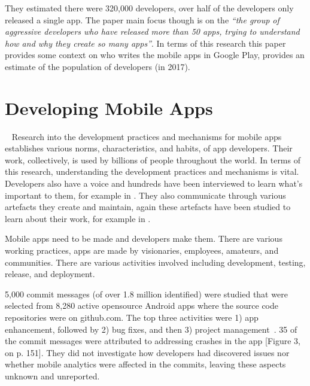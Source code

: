 They estimated there were 320,000 developers, over half of the developers only released a single app. The paper main focus though is on the \emph{``the group of aggressive developers who have released more than 50 apps, trying to understand how and why they create so many apps''}. In terms of this research this paper provides some context on who writes the mobile apps in Google Play, provides an estimate of the population of developers (in 2017).


\section{Developing Mobile Apps}~\label{rw-developing-mobile-apps-section}
Research into the development practices and mechanisms for mobile apps establishes various norms, characteristics, and habits, of app developers. Their work, collectively, is used by billions of people throughout the world. In terms of this research, understanding the development practices and mechanisms is vital. Developers also have a voice and hundreds have been interviewed to learn what's important to them, for example in . They also communicate through various artefacts they create and maintain, again these artefacts have been studied to learn about their work, for example in .


Mobile apps need to be made and developers make them. There are various working practices, apps are made by visionaries, employees, amateurs, and communities. There are various activities involved including development, testing, release, and deployment. %


5,000 commit messages (of over 1.8 million identified) were studied that were selected from 8,280 active opensource Android apps where the source code repositories were on github.com. The top three activities were 1) app enhancement, followed by 2) bug fixes, and then 3) project management~. 35 of the commit messages were attributed to addressing crashes in the app [Figure 3, on p. 151]. They did not investigate how developers had discovered issues nor whether mobile analytics were affected in the commits, leaving these aspects unknown and unreported.

